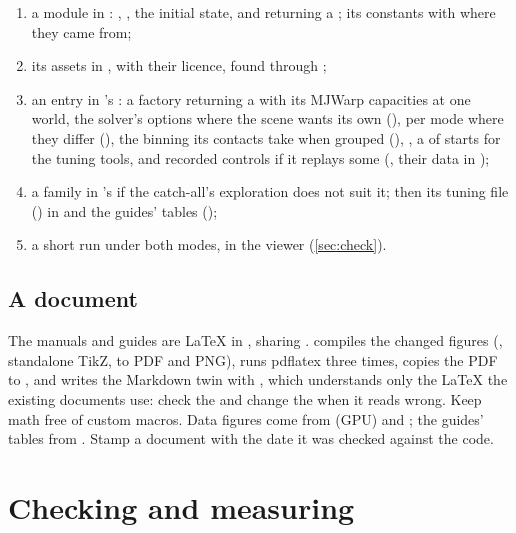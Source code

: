 \begin{enumerate}
\item a module in : , , the initial state, and  returning a ; its constants with where they came from;
\item its assets in , with their licence, found through ;
\item an entry in 's : a factory returning a  with its MJWarp capacities at one world, the solver's options where the scene wants its own (), per mode where they differ (), the binning its contacts take when grouped (), , a  of starts for the tuning tools, and recorded controls if it replays some (, their data in );
\item a family in 's  if the catch-all's exploration does not suit it; then its tuning file () in  and the guides' tables ();
\item a short run under both modes, in the viewer (\cref{sec:check}).
\end{enumerate}

\subsection{A document}\label{sec:adddoc}

The manuals and guides are LaTeX in , sharing .  compiles the changed figures (, standalone TikZ, to PDF and PNG), runs pdflatex three times, copies the PDF to , and writes the Markdown twin with , which understands only the LaTeX the existing documents use: check the  and change the  when it reads wrong. Keep math free of custom macros. Data figures come from  (GPU) and ; the guides' tables from . Stamp a document with the date it was checked against the code.

\section{Checking and measuring}\label{sec:checking}

